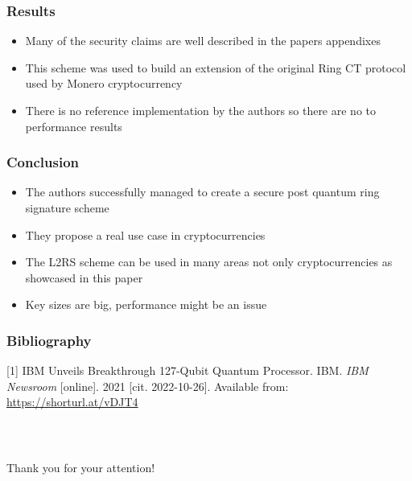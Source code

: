 \documentclass[%
  14pt,       				%
	c,                  %
	aspectratio=1610,   %
	unicode,						%
]{beamer}				    	%
\begin{document}
\begin{frame}
  \frametitle{Results}
  \large{
    \begin{itemize}
      \item Many of the security claims are well described in the papers appendixes
      \item This scheme was used to build an extension of the original Ring CT protocol used by Monero cryptocurrency
      \item There is no reference implementation by the authors so there are no to performance results
    \end{itemize}
  }
\end{frame}

\begin{frame}
  \frametitle{Conclusion}
  \large{
    \begin{itemize}
      \item The authors successfully managed to create a secure post quantum ring signature scheme
      \item They propose a real use case in cryptocurrencies
      \item The L2RS scheme can be used in many areas not only cryptocurrencies as showcased in this paper
      \item Key sizes are big, performance might be an issue
    \end{itemize}
  }
\end{frame}

\begin{frame}
  \frametitle{Bibliography}
  \small{
    [1] IBM Unveils Breakthrough 127-Qubit Quantum Processor. IBM. \textit{IBM Newsroom} [online]. 2021 [cit. 2022-10-26]. Available from: \url{https://shorturl.at/vDJT4}
  }
\end{frame}

\begin{frame}[c]
  \frametitle{\mbox{ }}
  \begin{center}
    {\Huge Thank you for your attention!}
  \end{center}
\end{frame}
\end{document}
